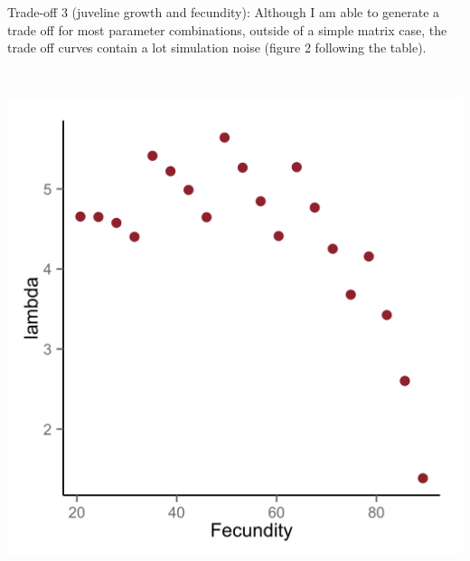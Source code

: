 \documentclass{article}\usepackage{graphicx, color}
\begin{document}
 
Trade-off 3 (juveline growth and fecundity): Although I am able to generate a trade off for most parameter combinations, outside of a simple matrix case, the trade off curves contain a lot simulation noise (figure 2 following the table).

\includegraphics[width=15cm,height=15cm]{t3.png} 

 
\end{document}
